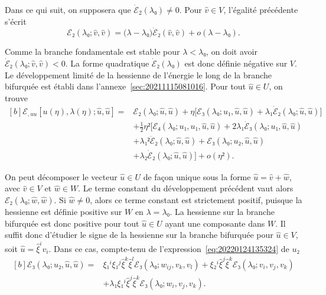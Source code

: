 \documentclass[12pt, final]{amsart}
\begin{document}
Dans ce qui suit, on supposera que \(\dot{ℰ}_2(λ₀)≠0\). Pour \(\hat{v}∈V\),
l'égalité précédente s'écrit
\begin{equation}
  ℰ₂(λ₀; \hat{v}, \hat{v})=\bigl(λ-λ₀\bigr)\dot{ℰ}₂(\hat{v}, \hat{v})+o(λ-λ₀).
\end{equation}

Comme la branche fondamentale est stable pour \(λ<λ₀\), on doit avoir
\(\dot{ℰ}₂(λ₀; \hat{v}, \hat{v})<0\). La forme quadratique \(\dot{ℰ}₂(λ₀)\) est
donc définie négative sur \(V\). Le développement limité de la hessienne de
l'énergie le long de la branche bifurquée est établi dans
l'annexe~\ref{sec:20211115081016}. Pour tout \(\hat{u}∈U\), on trouve
\begin{equation}
  \label{eq:20211115082025}
  \begin{aligned}[b]
    ℰ_{,uu}[u(η), λ(η); \hat{u}, \hat{u}]
    ={}&ℰ₂(λ₀; \hat{u}, \hat{u})+η\bigl[ℰ₃(λ₀; u₁, \hat{u}, \hat{u})
    +λ₁\dot{ℰ}₂(λ₀; \hat{u}, \hat{u})\bigr]\\
    &+\tfrac12η²\bigl[ℰ₄(λ₀; u₁, u₁, \hat{u}, \hat{u})
    +2λ₁\dot{ℰ}₃(λ₀; u₁, \hat{u}, \hat{u})\\
    &+λ₁²\ddot{ℰ}₂(λ₀; \hat{u}, \hat{u})
    +ℰ₃(λ₀; u₂, \hat{u}, \hat{u})\\
    &+λ₂\dot{ℰ}₂(λ₀; \hat{u}, \hat{u})\bigr]
    +o(η²).
  \end{aligned}
\end{equation}

On peut décomposer le vecteur \(\hat{u}∈U\) de façon unique sous la forme
\(\hat{u}=\hat{v}+\hat{w}\), avec \(\hat{v}∈V\) et \(\hat{w}∈W\). Le terme
constant du développement précédent vaut alors \(ℰ₂(λ₀; \hat{w}, \hat{w})\). Si
\(\hat{w}≠0\), alors ce terme constant est strictement positif, puisque la
hessienne est définie positive sur \(W\) en \(λ=λ₀\). La hessienne sur la
branche bifurquée est donc positive pour tout \(\hat{u}∈U\) ayant une
composante dans \(W\). Il suffit donc d'étudier le signe de la hessienne sur la
branche bifurquée pour \(\hat{u}∈V\), soit \(\hat{u}=\hat{ξ}^iv_i\). Dans ce
cas, compte-tenu de l'expression~\eqref{eq:20220124135324} de \(u₂\)
\begin{equation}
  \begin{aligned}[b]
    ℰ₃(λ₀; u₂, \hat{u}, \hat{u})={}&
    ξ₁^iξ₁^j\hat{ξ}^k\hat{ξ}^lℰ₃(λ₀; w_{ij}, v_k, v_l)
    +ξ₂^i\hat{ξ}^j\hat{ξ}^kℰ₃(λ₀; v_i, v_j, v_k)\\
    &+λ₁ξ₁^i\hat{ξ}^j\hat{ξ}^kℰ₃(λ₀; w_i, v_j, v_k).
  \end{aligned}
\end{equation}
\end{document}
